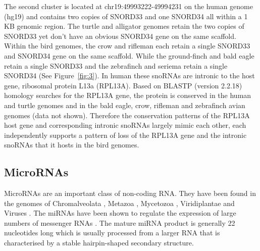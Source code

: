 \documentclass[10pt]{bmc_article}
\newenvironment{bmcformat}{\begin{raggedright}\baselineskip20pt\sloppy\setboolean{publ}{false}}{\end{raggedright}\baselineskip20pt\sloppy}
\begin{document}
\begin{bmcformat}


The second cluster is located at chr19:49993222-49994231 on the human
genome (hg19) and contains two copies of SNORD33 and one SNORD34 all
within a 1 KB genomic region. The turtle and alligator genomes retain
the two copies of SNORD33 yet don't have an obvious SNORD34 gene on
the same scaffold. Within the bird genomes, the crow and rifleman each
retain a single SNORD33 and SNORD34 gene on the same scaffold. While
the ground-finch and bald eagle retain a single SNORD33 and the
zebrafinch and seriema retain a single SNORD34 (See
Figure~\ref{fig:3}).  In human these snoRNAs are intronic to the host
gene, ribosomal protein L13a (RPL13A). Based on BLASTP (version
2.2.18) homology searches for the RPL13A gene, the protein is
conserved in the human and turtle genomes and in the bald eagle, crow,
rifleman and zebrafinch avian genomes (data not shown). Therefore the
conservation patterns of the RPL13A host gene and corresponding
intronic snoRNAs largely mimic each other, each independently supports
a pattern of loss of the RPL13A gene and the intronic snoRNAs that it
hosts in the bird genomes.


\subsection*{MicroRNAs}
MicroRNAs are an important class of non-coding RNA. They have been
found in the genomes of Chromalveolata \cite{Cock:2010,Huang:2011},
Metazoa \cite{Lee:1993,Lau:2001,Hertel:2006}, Mycetozoa
\cite{Hinas:2007,Avesson:2012}, Viridiplantae
\cite{Reinhart:2002,Fattash:2007,Axtell:2007,Molnar:2007} and Viruses
\cite{Pfeffer:2004,Ouellet:2008,Pfeffer:2005,Landgraf:2007}. The
miRNAs have been shown to regulate the expression of large numbers of
messenger RNAs \cite{Lim:2005}. The mature miRNA product is generally
22 nucleotides long which is usually processed from a larger RNA that
is characterised by a stable hairpin-shaped secondary structure.


\end{bmcformat}
\end{document}
